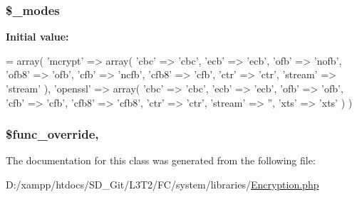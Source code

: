 \subsubsection[{\$\+\_\+modes}]{\setlength{\rightskip}{0pt plus 5cm}\$\+\_\+modes\hspace{0.3cm}{\ttfamily [protected]}}\label{class_c_i___encryption_abb65eeb1f25e268d87c4736add738492}
{\bfseries Initial value\+:}
\begin{DoxyCode}
= array(
        \textcolor{stringliteral}{'mcrypt'} => array(
            \textcolor{stringliteral}{'cbc'} => \textcolor{stringliteral}{'cbc'},
            \textcolor{stringliteral}{'ecb'} => \textcolor{stringliteral}{'ecb'},
            \textcolor{stringliteral}{'ofb'} => \textcolor{stringliteral}{'nofb'},
            \textcolor{stringliteral}{'ofb8'} => \textcolor{stringliteral}{'ofb'},
            \textcolor{stringliteral}{'cfb'} => \textcolor{stringliteral}{'ncfb'},
            \textcolor{stringliteral}{'cfb8'} => \textcolor{stringliteral}{'cfb'},
            \textcolor{stringliteral}{'ctr'} => \textcolor{stringliteral}{'ctr'},
            \textcolor{stringliteral}{'stream'} => \textcolor{stringliteral}{'stream'}
        ),
        \textcolor{stringliteral}{'openssl'} => array(
            \textcolor{stringliteral}{'cbc'} => \textcolor{stringliteral}{'cbc'},
            \textcolor{stringliteral}{'ecb'} => \textcolor{stringliteral}{'ecb'},
            \textcolor{stringliteral}{'ofb'} => \textcolor{stringliteral}{'ofb'},
            \textcolor{stringliteral}{'cfb'} => \textcolor{stringliteral}{'cfb'},
            \textcolor{stringliteral}{'cfb8'} => \textcolor{stringliteral}{'cfb8'},
            \textcolor{stringliteral}{'ctr'} => \textcolor{stringliteral}{'ctr'},
            \textcolor{stringliteral}{'stream'} => \textcolor{stringliteral}{''},
            \textcolor{stringliteral}{'xts'} => \textcolor{stringliteral}{'xts'}
        )
    )
\end{DoxyCode}
\hypertarget{class_c_i___encryption_a9f90fea779d0ce933f0adf8475920312}{}
\subsubsection[{\$func\+\_\+override}]{\setlength{\rightskip}{0pt plus 5cm}\$func\+\_\+override\hspace{0.3cm}{\ttfamily [static]}, {\ttfamily [protected]}}\label{class_c_i___encryption_a9f90fea779d0ce933f0adf8475920312}


The documentation for this class was generated from the following file\+:\begin{DoxyCompactItemize}
\item 
D\+:/xampp/htdocs/\+S\+D\+\_\+\+Git/\+L3\+T2/\+F\+C/system/libraries/\hyperlink{system_2libraries_2_encryption_8php}{Encryption.\+php}\end{DoxyCompactItemize}
